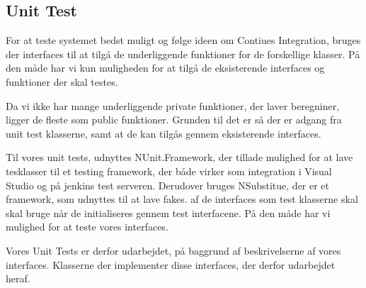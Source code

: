 \subsection{Unit Test}

For at teste systemet bedst muligt og følge ideen om Contiues Integration,
 bruges der interfaces til at tilgå de underliggende funktioner for de forskellige klasser.
 På den måde har vi kun muligheden for at tilgå de eksisterende interfaces og funktioner der skal testes. 
 
 Da vi ikke har mange underliggende private funktioner, der laver beregniner, ligger de fleste som public funktioner.
 Grunden til det er så der er adgang fra unit test klasserne, samt at de kan tilgås gennem eksisterende interfaces.

 Til vores unit tests, udnyttes NUnit.Framework, der tillade mulighed for at lave tesklasser til et testing framework, der både virker som integration i Visual Studio og på jenkins test serveren.
 Derudover bruges NSubstitue, der er et framework, som udnyttes til at lave fakes. af de interfaces som test klasserne skal skal bruge når de initialiseres gennem test interfacene.
 På den måde har vi mulighed for at teste vores interfaces.
 
 Vores Unit Tests er derfor udarbejdet, på baggrund af beskrivelserne af vores interfaces. Klasserne der implementer disse interfaces, der derfor udarbejdet heraf.


